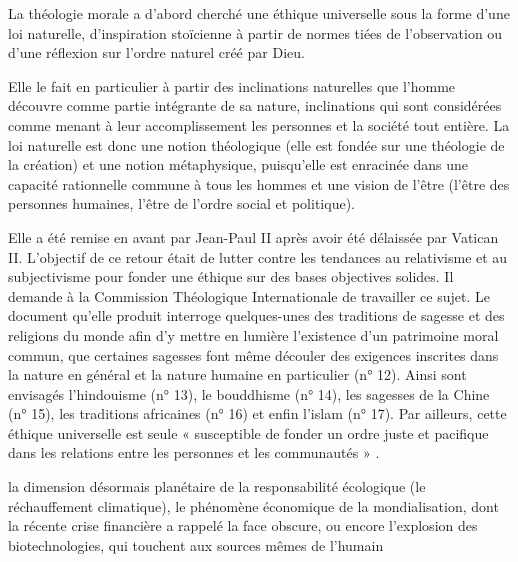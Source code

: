 La théologie morale a d'abord cherché une éthique universelle sous la forme d'une loi naturelle, d'inspiration stoïcienne à partir de normes tiées de l'observation ou d'une réflexion sur l'ordre naturel créé par Dieu. 

\begin{singlequote}
    Elle le fait en particulier à partir des inclinations naturelles que l’homme découvre comme partie intégrante de sa nature, inclinations qui sont considérées comme menant à leur accomplissement les personnes et la société tout entière. La loi naturelle est donc une notion théologique (elle est fondée sur une théologie de la création) et une notion métaphysique, puisqu’elle est enracinée dans une capacité rationnelle commune à tous les hommes et une vision de l’être (l’être des personnes humaines, l’être de l’ordre social et politique). \cite{thomasset_recherche_2020}
\end{singlequote} 

Elle a été remise en avant par Jean-Paul II après avoir été délaissée par Vatican II. L’objectif de ce retour était de lutter contre les tendances au relativisme et au subjectivisme pour fonder une éthique sur des bases objectives solides. Il demande à la Commission Théologique Internationale de travailler ce sujet. 
 Le document qu'elle produit interroge quelques-unes des traditions de sagesse et des religions du monde afin d’y mettre en lumière l’existence d’un patrimoine moral commun, que certaines sagesses font même découler des exigences inscrites dans la nature en général et la nature humaine en particulier (n° 12). Ainsi sont envisagés l’hindouisme (n° 13), le bouddhisme (n° 14), les sagesses de la Chine (n° 15), les traditions africaines (n° 16) et enfin l’islam (n° 17).\cite{bonino_questions_2011}
Par ailleurs, cette éthique universelle est seule « susceptible de fonder un ordre juste et pacifique dans les relations entre les personnes et les communautés » \cite[Commission Théologique Internationale]{bonino_questions_2011}. 
\begin{singlequote}
     la dimension désormais planétaire de la responsabilité écologique (le réchauffement climatique), le phénomène économique de la mondialisation, dont la récente crise financière a rappelé la face obscure, ou encore l’explosion des biotechnologies, qui touchent aux sources mêmes de l’humain \cite{bonino_questions_2011}
\end{singlequote}

